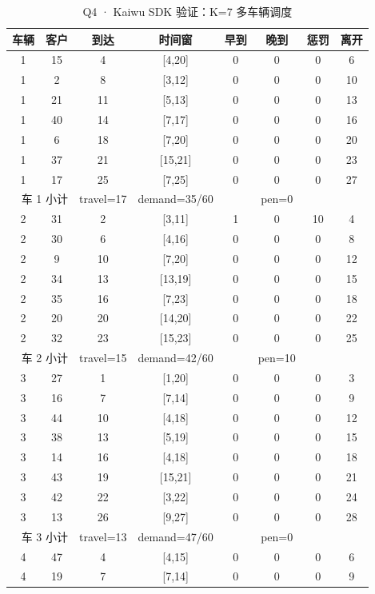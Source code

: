 \begin{table}[htbp]
\centering
\caption{Q4 · Kaiwu SDK 验证：K=7 多车辆调度}\label{tab:q4_kaiwu_routes}
\small
\begin{tabular}{cccccccc}
\toprule
车辆 & 客户 & 到达 & 时间窗 & 早到 & 晚到 & 惩罚 & 离开 \\
\midrule
1 & 15 & 4 & [4,20] & 0 & 0 & 0 & 6 \\
1 & 2 & 8 & [3,12] & 0 & 0 & 0 & 10 \\
1 & 21 & 11 & [5,13] & 0 & 0 & 0 & 13 \\
1 & 40 & 14 & [7,17] & 0 & 0 & 0 & 16 \\
1 & 6 & 18 & [7,20] & 0 & 0 & 0 & 20 \\
1 & 37 & 21 & [15,21] & 0 & 0 & 0 & 23 \\
1 & 17 & 25 & [7,25] & 0 & 0 & 0 & 27 \\
\multicolumn{2}{r}{车 1 小计} & travel=17 & demand=35/60 & & pen=0 & \\
\midrule
2 & 31 & 2 & [3,11] & 1 & 0 & 10 & 4 \\
2 & 30 & 6 & [4,16] & 0 & 0 & 0 & 8 \\
2 & 9 & 10 & [7,20] & 0 & 0 & 0 & 12 \\
2 & 34 & 13 & [13,19] & 0 & 0 & 0 & 15 \\
2 & 35 & 16 & [7,23] & 0 & 0 & 0 & 18 \\
2 & 20 & 20 & [14,20] & 0 & 0 & 0 & 22 \\
2 & 32 & 23 & [15,23] & 0 & 0 & 0 & 25 \\
\multicolumn{2}{r}{车 2 小计} & travel=15 & demand=42/60 & & pen=10 & \\
\midrule
3 & 27 & 1 & [1,20] & 0 & 0 & 0 & 3 \\
3 & 16 & 7 & [7,14] & 0 & 0 & 0 & 9 \\
3 & 44 & 10 & [4,18] & 0 & 0 & 0 & 12 \\
3 & 38 & 13 & [5,19] & 0 & 0 & 0 & 15 \\
3 & 14 & 16 & [4,18] & 0 & 0 & 0 & 18 \\
3 & 43 & 19 & [15,21] & 0 & 0 & 0 & 21 \\
3 & 42 & 22 & [3,22] & 0 & 0 & 0 & 24 \\
3 & 13 & 26 & [9,27] & 0 & 0 & 0 & 28 \\
\multicolumn{2}{r}{车 3 小计} & travel=13 & demand=47/60 & & pen=0 & \\
\midrule
4 & 47 & 4 & [4,15] & 0 & 0 & 0 & 6 \\
4 & 19 & 7 & [7,14] & 0 & 0 & 0 & 9 \\

\end{tabular}
\end{table}
